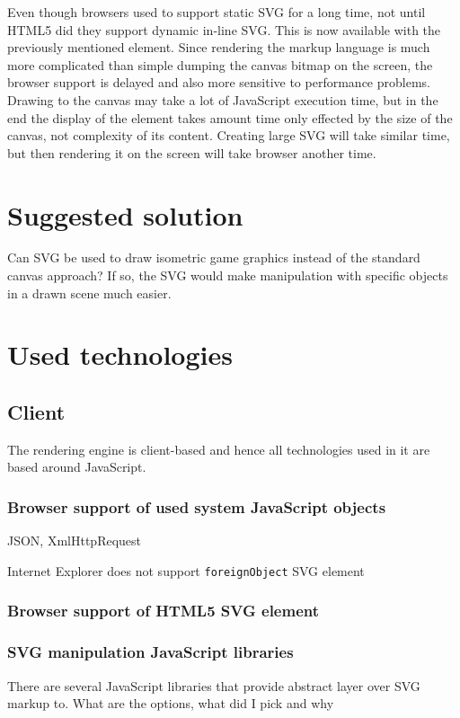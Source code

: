 \documentclass[11pt,oneside, final]{fithesis2}
\begin{document}
Even though browsers used to support static SVG for a long time, not until HTML5 did they support dynamic in-line SVG\cite{w3_html5}. This is now available with the previously mentioned element. Since rendering the markup language is much more complicated than simple dumping the canvas bitmap on the screen, the browser support is delayed and also more sensitive to performance problems. Drawing to the canvas may take a lot of JavaScript execution time, but in the end the display of the element takes amount time only effected by the size of the canvas, not complexity of its content. Creating large SVG will take similar time, but then rendering it on the screen will take browser another time.

\chapter{Suggested solution}
\label{solution}
Can SVG be used to draw isometric game graphics instead of the standard canvas approach? If so, the SVG would make manipulation with specific objects in a drawn scene much easier.

\chapter{Used technologies}
\label{tech}
\section{Client}
The rendering engine is client-based and hence all technologies used in it are based around JavaScript.

\subsection{Browser support of used system JavaScript objects}
JSON, XmlHttpRequest

Internet Explorer does not support \texttt{foreignObject} SVG element\cite{ieforeignobject}

\subsection{Browser support of HTML5 SVG element}

\subsection{SVG manipulation JavaScript libraries}
There are several JavaScript libraries that provide abstract layer over SVG markup to.
What are the options, what did I pick and why
\end{document}
